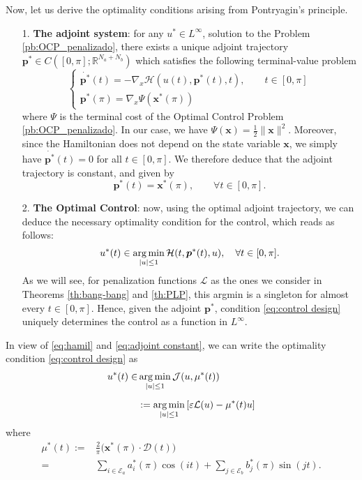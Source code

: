 \documentclass[twocolumn]{autart}    %
\begin{document}
Now, let us derive the optimality conditions arising from Pontryagin's principle.
\begin{itemize}
	\item[1.] \textbf{The adjoint system}: for any $u^\ast \in L^\infty$, solution to the Problem \ref{pb:OCP_penalizado}, there exists a unique adjoint trajectory $\bm{p}^\ast\in C([0,\pi]; \mathbb{R}^{N_a+N_b})$ which satisfies the following terminal-value problem
    \begin{equation*}
    	\begin{cases}
    		\dot{\bm{p}^\ast}(t) = -\nabla_x \mathcal{H}(u(t),\bm{p}^\ast(t),t), \qquad t \in [0,\pi] 
    		\\[5pt]
    		\bm{p}^\ast (\pi) = \nabla_x \Psi (\bm{x}^\ast (\pi))
    	\end{cases}
    \end{equation*}
    where $\Psi$ is the terminal cost of the Optimal Control Problem \ref{pb:OCP_penalizado}. In our case, we have $\Psi (\bm{x}) = \frac{1}{2} \| \bm{x}\|^2$. Moreover, since the Hamiltonian does not depend on the state variable $\bm{x}$, we simply have $\dot{\bm{p}^\ast}(t) = 0$ for all $t \in [0,\pi]$. We therefore deduce that the adjoint trajectory is constant, and given by
    \begin{equation}\label{eq:adjoint constant}
		\bm{p}^\ast (t) = \bm{x}^\ast (\pi), \qquad \forall t \in [0,\pi]. 
	\end{equation}
    
    \item[2.] \textbf{The Optimal  Control}: now, using the optimal adjoint trajectory, we can deduce the necessary optimality condition for the control, which reads as follows:
    \begin{align}\label{eq:control design}
    	u^* (t) \in \operatorname*{arg\,min}_{|u|\leq 1} \mathcal{H}(t,\bm{p}^*(t),u), \quad \forall t \in [0,\pi].
    \end{align}
    As we will see, for penalization functions $\mathcal{L}$ as the ones we consider in Theorems \ref{th:bang-bang} and \ref{th:PLP}, this argmin is a singleton for almost every $t\in [0,\pi]$. Hence, given the adjoint $\bm{p}^\ast$,  condition \eqref{eq:control design} uniquely determines the control as a function in $L^\infty$.
\end{itemize}
    
In view of \eqref{eq:hamil} and \eqref{eq:adjoint constant}, we can write the optimality condition \eqref{eq:control design} as
\begin{align}\label{eq:control design2}
    u^\ast(t)  \in & \operatorname*{arg\,min}_{|u|\leq 1}  \mathcal{J} (u,\mu^\ast(t))  
    \\[5pt]
    &:=\operatorname*{arg\,min}_{|u|\leq 1}   \left[\varepsilon \mathcal{L}(u) - \mu^\ast(t) u \right] \nonumber
\end{align}    
where 
\begin{align}\label{eq:m ast}
    \mu^\ast (t) := & \frac 2\pi \big(\bm{x}^*(\pi) \cdot \bm{\mathcal{D}}(t)\big) 
    \\[5pt]
    = & \sum_{i \in \mathcal{E}_a} a^*_i (\pi) \cos(it) + \sum_{j \in \mathcal{E}_b} b^*_j (\pi) \sin(jt). \nonumber
\end{align}
\end{document}

